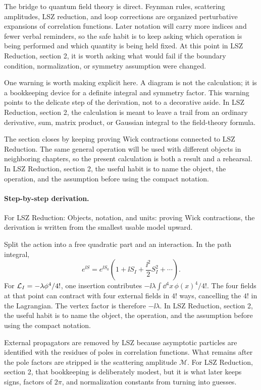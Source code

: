 The bridge to quantum field theory is direct.  Feynman rules, scattering amplitudes, LSZ reduction, and loop corrections are organized perturbative expansions of correlation functions.  Later notation will carry more indices and fewer verbal reminders, so the safe habit is to keep asking which operation is being performed and which quantity is being held fixed.  At this point in LSZ Reduction, section 2, it is worth asking what would fail if the boundary condition, normalization, or symmetry assumption were changed.

One warning is worth making explicit here.  A diagram is not the calculation; it is a bookkeeping device for a definite integral and symmetry factor.  This warning points to the delicate step of the derivation, not to a decorative aside.  In LSZ Reduction, section 2, the calculation is meant to leave a trail from an ordinary derivative, sum, matrix product, or Gaussian integral to the field-theory formula.

The section closes by keeping proving Wick contractions connected to LSZ Reduction.  The same general operation will be used with different objects in neighboring chapters, so the present calculation is both a result and a rehearsal.  In LSZ Reduction, section 2, the useful habit is to name the object, the operation, and the assumption before using the compact notation.



\paragraph{Step-by-step derivation.}

For LSZ Reduction: Objects, notation, and units: proving Wick contractions, the derivation is written from the smallest usable model upward.

Split the action into a free quadratic part and an interaction.  In the path integral,
\[
  e^{\ii S}=e^{\ii S_0}\left(1+\ii S_I+\frac{\ii^2}{2}S_I^2+\cdots\right).
\]
For \(\mathcal L_I=-\lambda\phi^4/4!\), one insertion contributes \(-\ii\lambda\int\dd^4x\,\phi(x)^4/4!\).  The four fields at that point can contract with four external fields in \(4!\) ways, cancelling the \(4!\) in the Lagrangian.  The vertex factor is therefore \(-\ii\lambda\).  In LSZ Reduction, section 2, the useful habit is to name the object, the operation, and the assumption before using the compact notation.

External propagators are removed by LSZ because asymptotic particles are identified with the residues of poles in correlation functions.  What remains after the pole factors are stripped is the scattering amplitude \(\mathcal M\).  For LSZ Reduction, section 2, that bookkeeping is deliberately modest, but it is what later keeps signs, factors of \(2\pi\), and normalization constants from turning into guesses.

